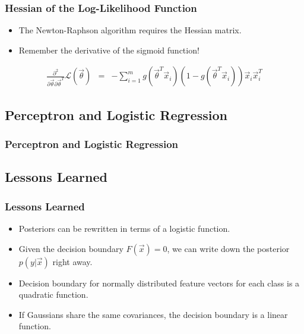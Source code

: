 \begin{frame}
  \frametitle{Hessian of the Log-Likelihood Function}

  \begin{itemize}
    \item The Newton-Raphson algorithm requires the Hessian matrix.
    \item Remember the derivative of the sigmoid function!
  \end{itemize}

  \begin{eqnarray*}
    \frac{\partial^2}{\partial\vec \theta \partial \vec \theta^T} \mathcal{L}(\vec \theta) &=& -
    \sum _{i=1}^m  g(\vec \theta^T\vec x_i) \left(1-g(\vec \theta^T\vec x_i)\right)\vec x_i \vec x_i^T
  \end{eqnarray*}  
\end{frame}


\subsection{Perceptron and Logistic Regression}

\begin{frame}
   \frametitle{Perceptron and Logistic Regression}
   
   \begin{center}
     \resizebox{.7\linewidth}{!}{
       
     }
   \end{center}
\end{frame}


\subsection{Lessons Learned}

\begin{frame}
  \frametitle{Lessons Learned}
   
  \begin{itemize}
    \item Posteriors can be rewritten in terms of a logistic function.\\[.5cm]
    \item Given the decision boundary $F(\vec x)=0$, we can write down the posterior $p(y|\vec x)$ right away.\\[.5cm]
    \item Decision boundary for normally distributed feature vectors for each class is a quadratic function.\\[.5cm]
    \item If Gaussians share the same covariances, the decision boundary is a linear function.
  \end{itemize}
\end{frame}

